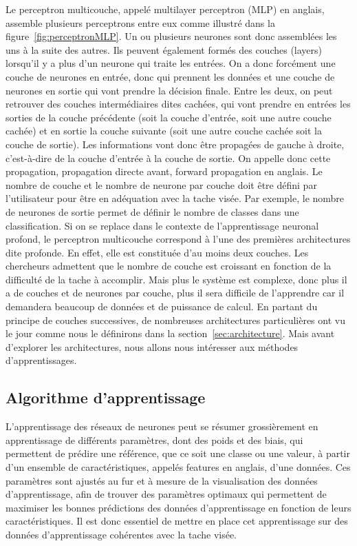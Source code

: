 Le perceptron multicouche, appelé multilayer perceptron (MLP) en anglais, assemble plusieurs perceptrons entre eux comme illustré dans la figure~\ref{fig:perceptronMLP}. Un ou plusieurs neurones sont donc assemblées les uns à la suite des autres. Ils peuvent également formés des couches (layers) lorsqu'il y a plus d'un neurone qui traite les entrées. On a donc forcément une couche de neurones en entrée, donc qui prennent les données et une couche de neurones en sortie qui vont prendre la décision finale. Entre les deux, on peut retrouver des couches intermédiaires dites cachées, qui vont prendre en entrées les sorties de la couche précédente (soit la couche d'entrée, soit une autre couche cachée) et en sortie la couche suivante (soit une autre couche cachée soit la couche de sortie).
Les informations vont donc être propagées de gauche à droite, c'est-à-dire de la couche d'entrée à la couche de sortie. On appelle donc cette propagation, propagation directe avant, forward propagation en anglais. Le nombre de couche et le nombre de neurone par couche doit être défini par l'utilisateur pour être en adéquation avec la tache visée. Par exemple, le nombre de neurones de sortie permet de définir le nombre de classes dans une classification.
Si on se replace dans le contexte de l'apprentissage neuronal profond, le perceptron multicouche correspond à l'une des premières architectures dite profonde. En effet, elle est constituée d'au moins deux couches. Les chercheurs admettent que le nombre de couche est croissant en fonction de la difficulté de la tache à accomplir. Mais plus le système est complexe, donc plus il a de couches et de neurones par couche, plus il sera difficile de l'apprendre car il demandera beaucoup de données et de puissance de calcul.
En partant du principe de couches successives, de nombreuses architectures particulières ont vu le jour comme nous le définirons dans la section~\ref{sec:architecture}. Mais avant d'explorer les architectures, nous allons nous intéresser aux méthodes d'apprentissages.

\subsection{Algorithme d'apprentissage}
L'apprentissage des réseaux de neurones peut se résumer grossièrement en apprentissage de différents paramètres, dont des poids et des biais, qui permettent de prédire une référence, que ce soit une classe ou une valeur, à partir d'un ensemble de caractéristiques, appelés features en anglais, d'une données. Ces paramètres sont ajustés au fur et à mesure de la visualisation des données d'apprentissage, afin de trouver des paramètres optimaux qui permettent de maximiser les bonnes prédictions des données d'apprentissage en fonction de leurs caractéristiques. Il est donc essentiel de mettre en place cet apprentissage sur des données d'apprentissage cohérentes avec la tache visée.

